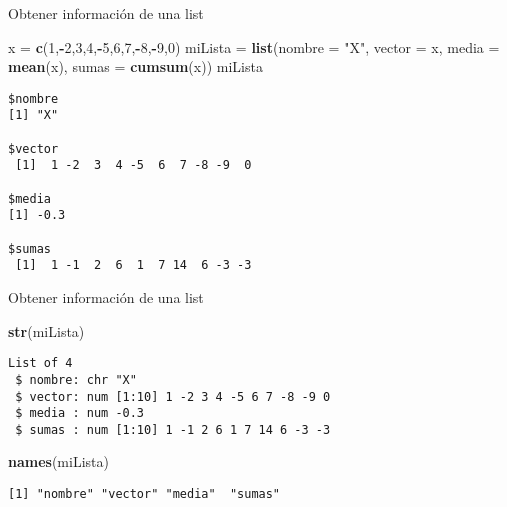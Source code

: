 \documentclass[
  ignorenonframetext,
]{beamer}
\newenvironment{Shaded}{\begin{snugshade}}{\end{snugshade}}
\newcommand{\DataTypeTok}[1]{\textcolor[rgb]{0.13,0.29,0.53}{#1}}
\newcommand{\DecValTok}[1]{\textcolor[rgb]{0.00,0.00,0.81}{#1}}
\newcommand{\KeywordTok}[1]{\textcolor[rgb]{0.13,0.29,0.53}{\textbf{#1}}}
\newcommand{\NormalTok}[1]{#1}
\newcommand{\OperatorTok}[1]{\textcolor[rgb]{0.81,0.36,0.00}{\textbf{#1}}}
\newcommand{\StringTok}[1]{\textcolor[rgb]{0.31,0.60,0.02}{#1}}
\begin{document}
\begin{frame}[fragile]{Obtener información de una list}
\protect\hypertarget{obtener-informaciuxf3n-de-una-list-1}{}

\begin{Shaded}
\begin{Highlighting}[]
\NormalTok{x =}\StringTok{ }\KeywordTok{c}\NormalTok{(}\DecValTok{1}\NormalTok{,}\OperatorTok{-}\DecValTok{2}\NormalTok{,}\DecValTok{3}\NormalTok{,}\DecValTok{4}\NormalTok{,}\OperatorTok{-}\DecValTok{5}\NormalTok{,}\DecValTok{6}\NormalTok{,}\DecValTok{7}\NormalTok{,}\OperatorTok{-}\DecValTok{8}\NormalTok{,}\OperatorTok{-}\DecValTok{9}\NormalTok{,}\DecValTok{0}\NormalTok{)}
\NormalTok{miLista =}\StringTok{ }\KeywordTok{list}\NormalTok{(}\DataTypeTok{nombre =} \StringTok{"X"}\NormalTok{, }\DataTypeTok{vector =}\NormalTok{ x, }\DataTypeTok{media =} \KeywordTok{mean}\NormalTok{(x), }\DataTypeTok{sumas =} \KeywordTok{cumsum}\NormalTok{(x))}
\NormalTok{miLista}
\end{Highlighting}
\end{Shaded}

\begin{verbatim}
$nombre
[1] "X"

$vector
 [1]  1 -2  3  4 -5  6  7 -8 -9  0

$media
[1] -0.3

$sumas
 [1]  1 -1  2  6  1  7 14  6 -3 -3
\end{verbatim}

\end{frame}

\begin{frame}[fragile]{Obtener información de una list}
\protect\hypertarget{obtener-informaciuxf3n-de-una-list-2}{}

\begin{Shaded}
\begin{Highlighting}[]
\KeywordTok{str}\NormalTok{(miLista)}
\end{Highlighting}
\end{Shaded}

\begin{verbatim}
List of 4
 $ nombre: chr "X"
 $ vector: num [1:10] 1 -2 3 4 -5 6 7 -8 -9 0
 $ media : num -0.3
 $ sumas : num [1:10] 1 -1 2 6 1 7 14 6 -3 -3
\end{verbatim}

\begin{Shaded}
\begin{Highlighting}[]
\KeywordTok{names}\NormalTok{(miLista)}
\end{Highlighting}
\end{Shaded}

\begin{verbatim}
[1] "nombre" "vector" "media"  "sumas" 
\end{verbatim}

\end{frame}
\end{document}
